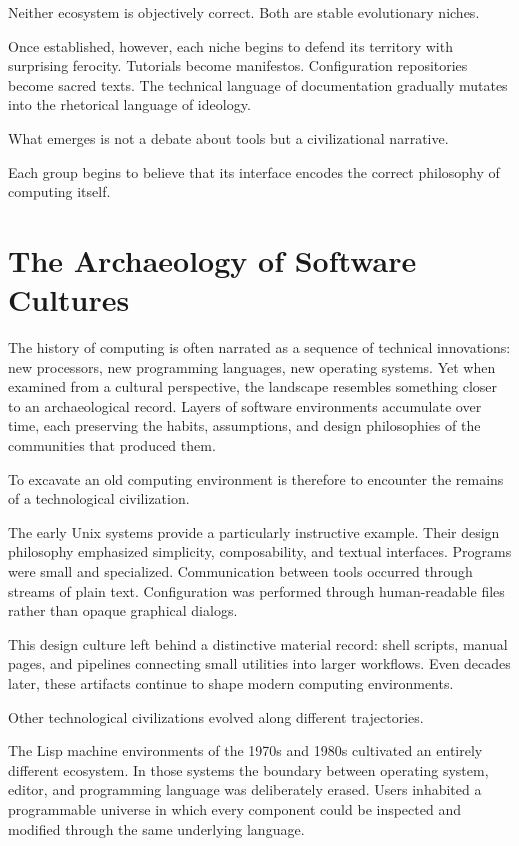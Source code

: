 \documentclass[11pt]{article}
\theoremstyle{definition}
\begin{document}
Neither ecosystem is objectively correct. Both are stable evolutionary
niches.

Once established, however, each niche begins to defend its territory
with surprising ferocity. Tutorials become manifestos. Configuration
repositories become sacred texts. The technical language of documentation
gradually mutates into the rhetorical language of ideology.

What emerges is not a debate about tools but a civilizational narrative.

Each group begins to believe that its interface encodes the correct
philosophy of computing itself.

\section{The Archaeology of Software Cultures}

The history of computing is often narrated as a sequence of technical
innovations: new processors, new programming languages, new operating
systems. Yet when examined from a cultural perspective, the landscape
resembles something closer to an archaeological record. Layers of
software environments accumulate over time, each preserving the habits,
assumptions, and design philosophies of the communities that produced
them.

To excavate an old computing environment is therefore to encounter the
remains of a technological civilization.

The early Unix systems provide a particularly instructive example.
Their design philosophy emphasized simplicity, composability, and
textual interfaces. Programs were small and specialized. Communication
between tools occurred through streams of plain text. Configuration was
performed through human-readable files rather than opaque graphical
dialogs.

This design culture left behind a distinctive material record: shell
scripts, manual pages, and pipelines connecting small utilities into
larger workflows. Even decades later, these artifacts continue to shape
modern computing environments.

Other technological civilizations evolved along different trajectories.

The Lisp machine environments of the 1970s and 1980s cultivated an
entirely different ecosystem. In those systems the boundary between
operating system, editor, and programming language was deliberately
erased. Users inhabited a programmable universe in which every
component could be inspected and modified through the same underlying
language.
\end{document}
